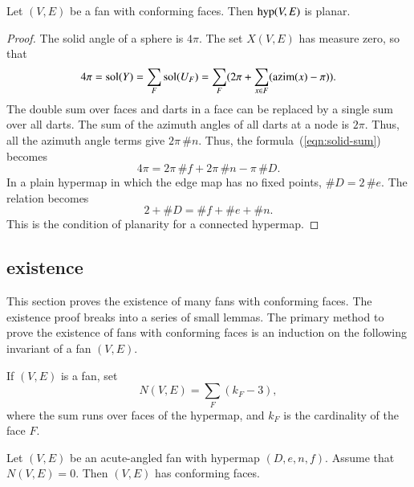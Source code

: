 \begin{lemma}  
Let $(V,E)$ be a fan with conforming faces.  
Then ${\operatorname{hyp}}(V,E)$ is planar.
\end{lemma}
%
%

\begin{proof}  The solid angle of a sphere is $4\pi$.  The set $X(V,E)$
has measure zero, so that
\begin{equation}\label{eqn:solid-sum}
4\pi = \operatorname{sol}(Y)= \sum_F \operatorname{sol}(U_F) = 
\sum_F ( 2\pi + \sum_{x\in F} ({\operatorname{azim}}(x)-\pi) ).
\end{equation}
The double sum over faces and darts in a face can be replaced by
a single sum over all darts.  
The sum of the azimuth angles of all darts at a node is $2\pi$. Thus,
all the azimuth angle terms give $2\pi\,\#n$.
Thus, the formula~(\ref{eqn:solid-sum}) becomes
$$
4\pi = 2\pi\, \#f +2\pi\,\#n - \pi\, \#D.
$$
In a plain hypermap in which the edge map has no fixed points, $\#D = 2\,\#e$.
The relation becomes
$$
2 + \#D = \#f + \#e + \#n.
$$
This is the condition of planarity for a connected hypermap.
\end{proof}
%

\subsection{existence}




This section proves the existence of many fans with conforming faces.
The existence proof breaks into a series of small lemmas.  The primary  method to prove the existence of fans with conforming faces is an induction on the following invariant of a fan $(V,E)$.  

\begin{definition}[$N(V,E)$]
If $(V,E)$ is a fan,  set
$$
N(V,E) = \sum_F (k_F - 3),
$$
where the sum runs over faces of the  hypermap, and $k_F$ is the cardinality of the face $F$.
\end{definition}

\begin{lemma} 
Let $(V,E)$ be an acute-angled fan with hypermap $(D,e,n,f)$. 
Assume that $N(V,E)=0$.
Then $(V,E)$ has conforming faces.
\end{lemma}
%
%
%

